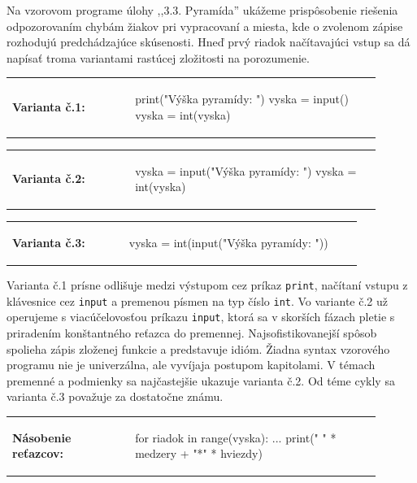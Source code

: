 Na vzorovom programe úlohy ,,3.3. Pyramída'' ukážeme prispôsobenie riešenia odpozorovaním chybám žiakov pri vypracovaní a miesta, kde o zvolenom zápise rozhodujú predchádzajúce skúsenosti. Hneď prvý riadok načítavajúci vstup sa dá napísať troma variantami rastúcej zložitosti na porozumenie. 

\begin{tabular}{@{}p{0.3\linewidth}p{0.6\linewidth}}
\textbf{\small Varianta č.1:} &
\vspace{-3em}
\begin{code}
print("Výška pyramídy: ")
vyska = input()
vyska = int(vyska)
\end{code}
\end{tabular}

\vspace{-2em}
\begin{tabular}{@{}p{0.3\linewidth}p{0.6\linewidth}}
\textbf{\small Varianta č.2:} &
\vspace{-3em}
\begin{code}
vyska = input("Výška pyramídy: ")
vyska = int(vyska)
\end{code}
\end{tabular}

\vspace{-2em}
\begin{tabular}{@{}p{0.3\linewidth}p{0.6\linewidth}}
\textbf{\small Varianta č.3:} &
\vspace{-3em}
\begin{code}
vyska = int(input("Výška pyramídy: "))
\end{code}
\end{tabular}

Varianta č.1 prísne odlišuje medzi výstupom cez príkaz \verb|print|, načítaní vstupu z klávesnice cez \verb|input| a premenou písmen na typ číslo \verb|int|. Vo variante č.2 už operujeme s viacúčelovosťou príkazu \verb|input|, ktorá sa v skorších fázach pletie s priradením konštantného reťazca do premennej. Najsofistikovanejší spôsob spolieha zápis zloženej funkcie a predstavuje idióm. Žiadna syntax vzorového programu nie je univerzálna, ale vyvíjaja postupom kapitolami. V témach premenné a podmienky sa najčastejšie ukazuje varianta č.2. Od téme cykly sa varianta č.3 považuje za dostatočne známu.

\begin{tabular}{@{}p{0.3\linewidth}p{0.6\linewidth}}
\textbf{\small Násobenie reťazcov:} &
\vspace{-3em}
\begin{code}
for riadok in range(vyska):
	...
	print(" " * medzery + "*" * hviezdy)
\end{code}
\end{tabular}

